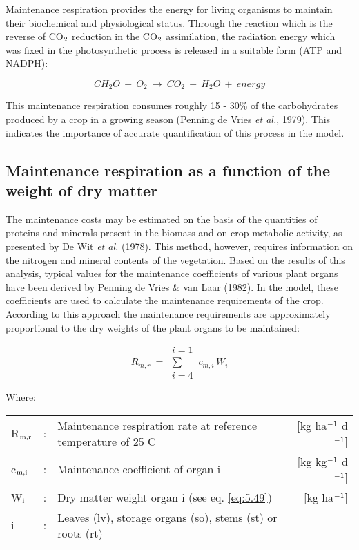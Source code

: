 Maintenance respiration provides the energy for living organisms to maintain their
biochemical and physiological status. Through the reaction which is the reverse of CO$_{{\rm 2}}$
reduction in the CO$_{{\rm 2}}$ assimilation, the radiation energy which was fixed in the
photosynthetic process is released in a suitable form (ATP and NADPH):

\begin{equation}
CH _{2} O ~+~ O _{2} ~\longrightarrow~ CO _{2} ~+~ H _{2} O ~+~ energy
\end{equation}

This maintenance respiration consumes roughly 15 - 30\% of the carbohydrates produced
by a crop in a growing season (Penning de Vries {\it et al.}, 1979). This indicates the
importance of accurate quantification of this process in the model.

\subsection{Maintenance respiration as a function of the weight of dry matter}
The maintenance costs may be estimated on the basis of the quantities of proteins and
minerals present in the biomass and on crop metabolic activity, as presented by De Wit {\it et
	al.} (1978). This method, however, requires information on the nitrogen and mineral
contents of the vegetation.
Based on the results of this analysis, typical values for the maintenance coefficients of
various plant organs have been derived by Penning de Vries \& van Laar (1982).
In the model, these coefficients are used to calculate the maintenance requirements of the
crop. According to this approach the maintenance requirements are approximately 
proportional to the dry weights of the plant organs to be maintained: 

\begin{equation}
\label{eq:5.39}
R _{m,r} ~ = ~\begin{array}{c} {i=1}  \\
\sum  \\
{i=4}\end{array} \, c _{m,i} \, W _{i}
\end{equation}

Where:\\[5pt]
\begin{tabularx}{\textwidth}{llXr}
	R$_{{\rm m,r}}$ &:& Maintenance respiration rate at reference 
	temperature of 25 \degrees C &   [kg ha$^{{\rm -1}}$ d$^{{\rm -1}}$]\\
	c$_{{\rm m,i}}$ &:& Maintenance coefficient of organ i  & [kg kg$^{{\rm -1}}$ d$^{{\rm -1}}$]\\
	W$_{{\rm i}}$ &:& Dry matter weight organ i (see eq. \ref{eq:5.49})   &     [kg ha$^{{\rm -1}}$]\\
	i &:& Leaves (lv), storage organs (so), stems (st) or roots (rt)\\ 
\end{tabularx}

